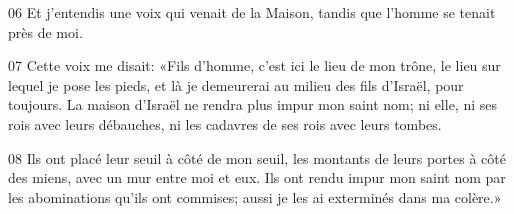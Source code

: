 
06 Et j’entendis une voix qui venait de la Maison, tandis que l’homme se tenait près de moi.

07 Cette voix me disait: «Fils d’homme, c’est ici le lieu de mon trône, le lieu sur lequel je pose les pieds, et là je demeurerai au milieu des fils d’Israël, pour toujours. La maison d’Israël ne rendra plus impur mon saint nom; ni elle, ni ses rois avec leurs débauches, ni les cadavres de ses rois avec leurs tombes.

08 Ils ont placé leur seuil à côté de mon seuil, les montants de leurs portes à côté des miens, avec un mur entre moi et eux. Ils ont rendu impur mon saint nom par les abominations qu’ils ont commises; aussi je les ai exterminés dans ma colère.»
